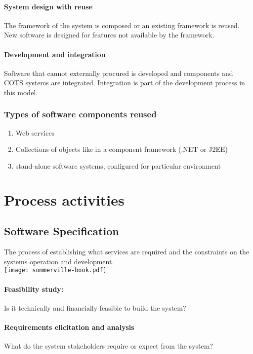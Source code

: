 \documentclass[a4paper,11pt,twocolumn]{report}
\begin{document}
    \paragraph{System design with reuse}
    The framework of the system is composed or an existing framework is reused.
    New software is designed for features not available by the framework.
    \paragraph{Development and integration}
    Software that cannot externally procured is developed and components and
    COTS systems are integrated. Integration is part of the development
    process in this model.
    \subsubsection{Types of software components reused}
    \begin{enumerate}
        \item Web services
        \item Collections of objects like in a component framework (.NET or
            J2EE)
        \item stand-alone software systems, configured for particular
            environment
    \end{enumerate}
    \section{Process activities}
    \subsection{Software Specification}
    The process of establishing what services are required and the constraints
    on the systems operation and development.\\
    \texttt{[image: sommerville-book.pdf]}\\
    \paragraph{Feasibility study:} Is it technically and financially feasible to
    build the system?
    \paragraph{Requirements elicitation and analysis} What do the system
    stakeholders require or expect from the system?
\end{document}
